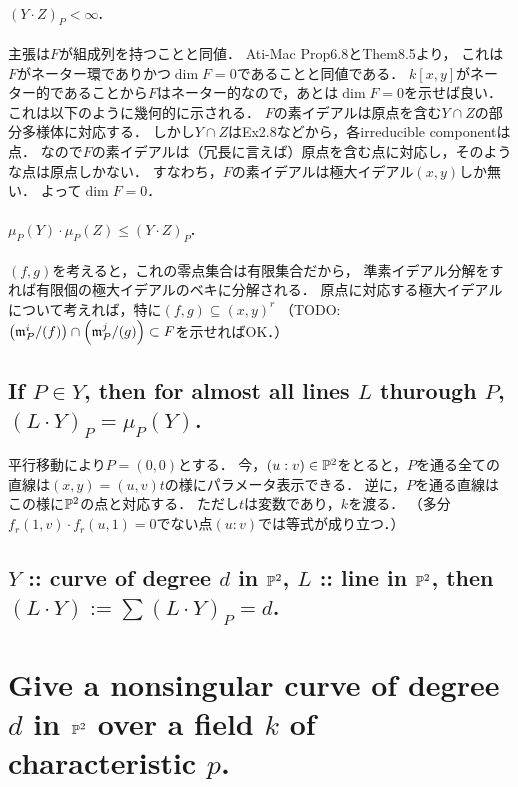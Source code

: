 \documentclass[a4paper]{jsarticle}
\begin{document}
    \paragraph{$(Y \cdot Z)_P < \infty$.}
    主張は$F$が組成列を持つことと同値．
    Ati-Mac Prop6.8とThem8.5より，
    これは$F$がネーター環でありかつ$\dim F=0$であることと同値である．
    $k[x,y]$がネーター的であることから$F$はネーター的なので，あとは$\dim F=0$を示せば良い．
    これは以下のように幾何的に示される．
    $F$の素イデアルは原点を含む$Y \cap Z$の部分多様体に対応する．
    しかし$Y \cap Z$はEx2.8などから，各irreducible componentは点．
    なので$F$の素イデアルは（冗長に言えば）原点を含む点に対応し，そのような点は原点しかない．
    すなわち，$F$の素イデアルは極大イデアル$(x,y)$しか無い．
    よって$\dim F=0$．

    \paragraph{$\mu_P(Y) \cdot \mu_P(Z) \leq (Y \cdot Z)_P$.}
    $(f,g)$を考えると，これの零点集合は有限集合だから，
    準素イデアル分解をすれば有限個の極大イデアルのベキに分解される．
    原点に対応する極大イデアルについて考えれば，特に$(f,g) \subseteq (x,y)^r$
    （TODO: $\left( \mathfrak{m}_P^i/(f) \right) \cap \left( \mathfrak{m}_P^j/(g) \right) \subset F$を示せればOK．）

    \subsection{If $P \in Y$, then for almost all lines $L$ thurough $P$, $(L \cdot Y)_P=\mu_P(Y)$.}
    平行移動により$P=(0,0)$とする．
    今，$(u:v) \in \mathbb{P}^2$をとると，$P$を通る全ての直線は$(x,y)=(u,v)t$の様にパラメータ表示できる．
    逆に，$P$を通る直線はこの様に$\mathbb{P}^2$の点と対応する．
    ただし$t$は変数であり，$k$を渡る．
    （多分$f_r(1,v) \cdot f_r(u,1)=0$でない点$(u:v)$では等式が成り立つ．）

    \subsection{$Y$ :: curve of degree $d$ in $\mathbb{P}^2$, $L$ :: line in $\mathbb{P}^2$, then $(L \cdot Y):=\sum (L \cdot Y)_P=d$.}

\section{Give a nonsingular curve of degree $d$ in $\mathbb{P}^2$ over a field $k$ of characteristic $p$.} %
\end{document}
